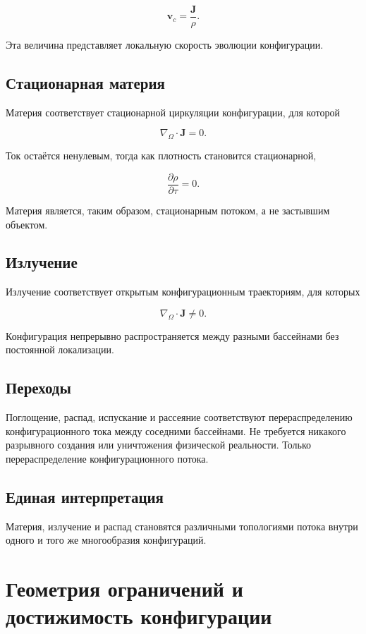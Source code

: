 \[ \boxed{ \mathbf v_c = \frac{\mathbf J}{\rho}. } \]

Эта величина представляет локальную скорость эволюции конфигурации.

\section{Стационарная материя}

Материя соответствует стационарной циркуляции конфигурации, для которой

\[ \nabla_\Omega\cdot\mathbf J=0. \]

Ток остаётся ненулевым, тогда как плотность становится стационарной,

\[ \frac{\partial\rho}{\partial\tau}=0. \]

Материя является, таким образом, стационарным потоком, а не застывшим объектом.

\section{Излучение}

Излучение соответствует открытым конфигурационным траекториям, для которых

\[ \nabla_\Omega\cdot\mathbf J\neq0. \]

Конфигурация непрерывно распространяется между разными бассейнами без постоянной локализации.

\section{Переходы}

Поглощение, распад, испускание и рассеяние соответствуют перераспределению конфигурационного тока между соседними бассейнами. Не требуется никакого разрывного создания или уничтожения физической реальности. Только перераспределение конфигурационного потока.

\section{Единая интерпретация}

Материя, излучение и распад становятся различными топологиями потока внутри одного и того же многообразия конфигураций.

\chapter{Геометрия ограничений и достижимость конфигурации}

